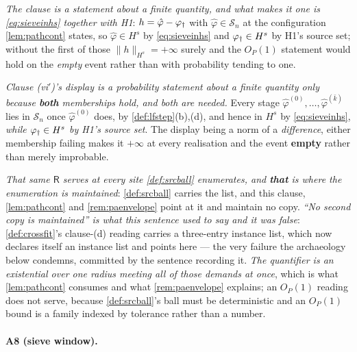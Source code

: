 \medskip
\noindent
\emph{The clause is a statement about a
finite quantity, and what makes it one is \eqref{eq:sieveinhs} together with H1}:
$h=\hat\varphi-\varphi_{\dagger}$ with $\hat\varphi\in\mathcal S_n$ at the configuration
\cref{lem:pathcont} states, so $\hat\varphi\in H^{s}$ by \eqref{eq:sieveinhs} and $\varphi_{\dagger}\in H^{s}$
by H1's source set; without the first of those $\|h\|_{H^{s}}=+\infty$ surely and the
$O_P(1)$ statement would hold on the \emph{empty} event rather than with probability tending to one.

\medskip
\noindent
\emph{Clause \textup{(vi$'$)}'s display is a probability statement about a finite quantity only because
\textbf{both} memberships hold, and both are needed.} Every stage
$\hat\varphi^{(0)},\dots,\hat\varphi^{(\bar k)}$ lies in $\mathcal S_n$ once $\hat\varphi^{(0)}$ does, by
\cref{def:lfstep}\textup{(b)},\textup{(d)}, and hence in $H^{s}$ by \eqref{eq:sieveinhs}, \emph{while
$\varphi_{\dagger}\in H^{s}$ by H1's source set}. The display being a norm of a \emph{difference}, either
membership failing makes it $+\infty$ at every realisation and the event \textbf{empty} rather than
merely improbable.

\medskip
\noindent
\emph{That same $\mathsf R$ serves at every site \cref{def:srcball} enumerates, and \textbf{that} is
where the enumeration is maintained}: \cref{def:srcball} carries the list, and this clause,
\cref{lem:pathcont} and \cref{rem:paenvelope} point at it and maintain no copy.
\emph{``No second copy is maintained'' is what this sentence used to say and it was false}:
\cref{def:crossfit}'s clause-\textup{(d)} reading carries a three-entry instance list, which now
declares itself an instance list and points here --- the very failure the archaeology below
condemns, committed by the sentence recording it.
\emph{The quantifier is an existential over
one radius meeting all of those demands at once}, which is what \cref{lem:pathcont} consumes and what
\cref{rem:paenvelope} explains; an $O_P(1)$ reading does not serve, because \cref{def:srcball}'s ball must
be deterministic and an $O_P(1)$ bound is a family indexed by tolerance rather than a number.

\paragraph{A8 (sieve window).}


